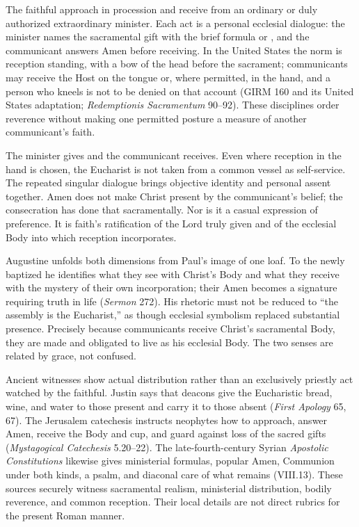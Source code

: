 The faithful approach in procession and receive from an ordinary or duly authorized extraordinary minister. Each act is a personal ecclesial dialogue: the minister names the sacramental gift with the brief formula  or , and the communicant answers Amen before receiving. In the United States the norm is reception standing, with a bow of the head before the sacrament; communicants may receive the Host on the tongue or, where permitted, in the hand, and a person who kneels is not to be denied on that account (GIRM 160 and its United States adaptation; \emph{Redemptionis Sacramentum} 90--92). These disciplines order reverence without making one permitted posture a measure of another communicant's faith.

The minister gives and the communicant receives. Even where reception in the hand is chosen, the Eucharist is not taken from a common vessel as self-service. The repeated singular dialogue brings objective identity and personal assent together. Amen does not make Christ present by the communicant's belief; the consecration has done that sacramentally. Nor is it a casual expression of preference. It is faith's ratification of the Lord truly given and of the ecclesial Body into which reception incorporates.

Augustine unfolds both dimensions from Paul's image of one loaf. To the newly baptized he identifies what they see with Christ's Body and what they receive with the mystery of their own incorporation; their Amen becomes a signature requiring truth in life (\emph{Sermon} 272). His rhetoric must not be reduced to ``the assembly is the Eucharist,'' as though ecclesial symbolism replaced substantial presence. Precisely because communicants receive Christ's sacramental Body, they are made and obligated to live as his ecclesial Body. The two senses are related by grace, not confused.

Ancient witnesses show actual distribution rather than an exclusively priestly act watched by the faithful. Justin says that deacons give the Eucharistic bread, wine, and water to those present and carry it to those absent (\emph{First Apology} 65, 67). The Jerusalem catechesis instructs neophytes how to approach, answer Amen, receive the Body and cup, and guard against loss of the sacred gifts (\emph{Mystagogical Catechesis} 5.20--22). The late-fourth-century Syrian \emph{Apostolic Constitutions} likewise gives ministerial formulas, popular Amen, Communion under both kinds, a psalm, and diaconal care of what remains (VIII.13). These sources securely witness sacramental realism, ministerial distribution, bodily reverence, and common reception. Their local details are not direct rubrics for the present Roman manner.

